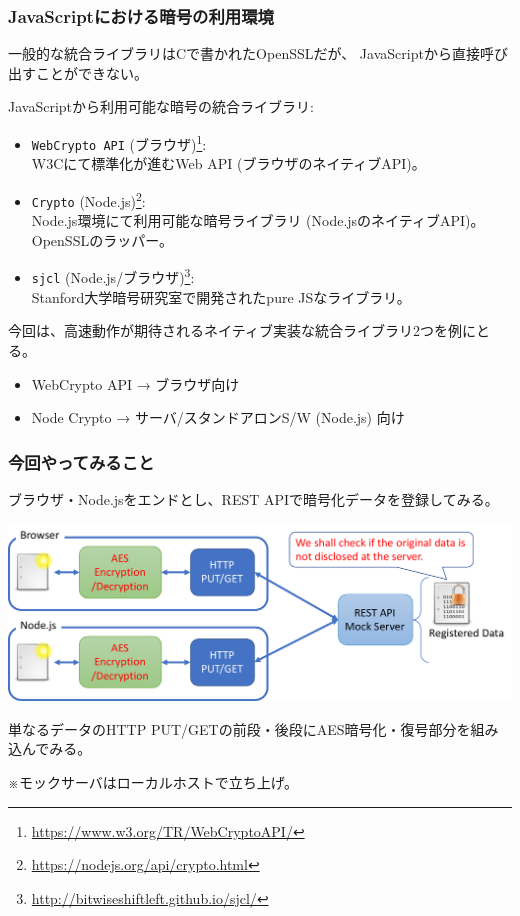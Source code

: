 \documentclass[12pt,dvipdfmx]{beamer}
\begin{document}
\begin{frame}
\frametitle{JavaScriptにおける暗号の利用環境}
\small
一般的な統合ライブラリはCで書かれたOpenSSLだが、
JavaScriptから直接呼び出すことができない。

\vspace{1ex}

JavaScriptから利用可能な暗号の統合ライブラリ:
\begin{itemize}
\item \alert{\texttt{WebCrypto API}} (ブラウザ)\footnote[frame]{\url{https://www.w3.org/TR/WebCryptoAPI/}}:\\
W3Cにて標準化が進むWeb API (ブラウザのネイティブAPI)。
\item \alert{\texttt{Crypto}} (Node.js)\footnote[frame]{\url{https://nodejs.org/api/crypto.html}}:\\
Node.js環境にて利用可能な暗号ライブラリ (Node.jsのネイティブAPI)。OpenSSLのラッパー。
\item \texttt{sjcl} (Node.js/ブラウザ)\footnote[frame]{\url{http://bitwiseshiftleft.github.io/sjcl/}}:\\
Stanford大学暗号研究室で開発されたpure JSなライブラリ。
\end{itemize}
\end{frame}

\begin{frame}
今回は、高速動作が期待されるネイティブ実装な統合ライブラリ2つを例にとる。
\begin{itemize}
 \item WebCrypto API → ブラウザ向け
 \item Node Crypto → サーバ/スタンドアロンS/W (Node.js) 向け
\end{itemize}
\end{frame}

\begin{frame}
\frametitle{今回やってみること}
ブラウザ・Node.jsをエンドとし、REST APIで暗号化データを登録してみる。
\begin{center}
\includegraphics[width=\linewidth]{Figs/mock_flow.pdf}
\end{center}
単なるデータのHTTP PUT/GETの前段・後段にAES暗号化・復号部分を組み込んでみる。

※モックサーバはローカルホストで立ち上げ。
\end{frame}
\end{document}

